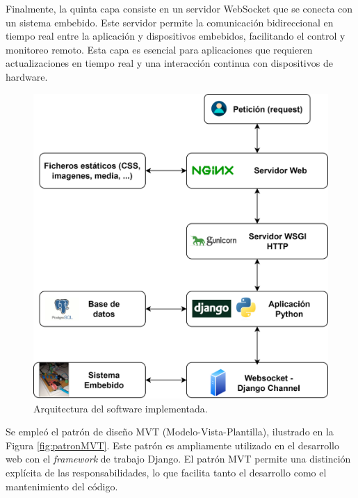 Finalmente, la quinta capa consiste en un servidor WebSocket que se conecta con un sistema embebido. Este servidor permite la comunicación bidireccional en tiempo real entre la aplicación y dispositivos embebidos, facilitando el control y monitoreo remoto. Esta capa es esencial para aplicaciones que requieren actualizaciones en tiempo real y una interacción continua con dispositivos de hardware.

\begin{figure}[H]
    \centering
    \includegraphics[width=0.7\linewidth]{Figuras/AplicacionWeb/arquitecturaSoft.png}
    \caption{Arquitectura del software implementada.}
    \label{fig:arquitecturaSoft}
\end{figure}
Se empleó el patrón de diseño MVT (Modelo-Vista-Plantilla), ilustrado en la Figura \ref{fig:patronMVT}. Este patrón es ampliamente utilizado en el desarrollo web con el \textit{framework} de trabajo Django. El patrón MVT permite una distinción explícita de las responsabilidades, lo que facilita tanto el desarrollo como el mantenimiento del código.

